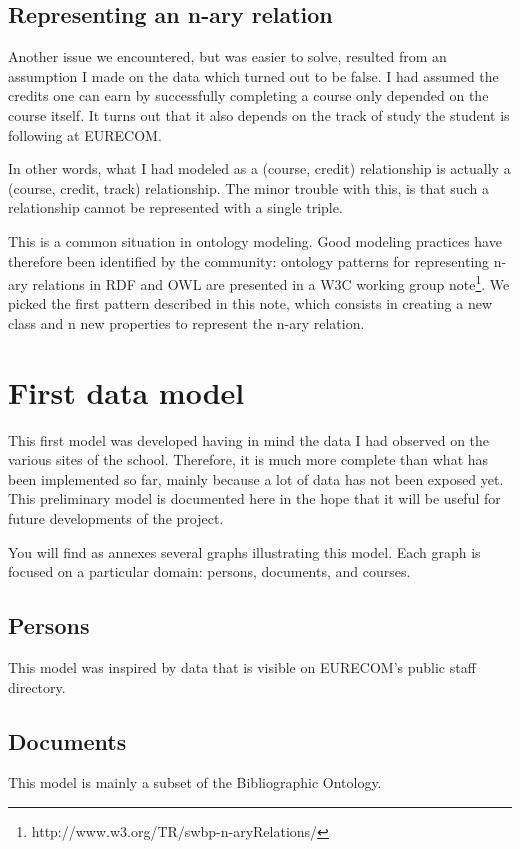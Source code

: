 \documentclass[a4paper,11pt]{report}
\begin{document}
\subsection{Representing an n-ary relation}
Another issue we encountered, but was easier to solve, resulted from an assumption I made on the data which turned out to be false. I had assumed the credits one can earn by successfully completing a course only depended on the course itself. It turns out that it also depends on the track of study the student is following at EURECOM. 

In other words, what I had modeled as a (course, credit) relationship is actually a (course, credit, track) relationship. The minor trouble with this, is that such a relationship cannot be represented with a single triple. 

This is a common situation in ontology modeling. Good modeling practices have therefore been identified by the community: ontology patterns for representing n-ary relations in RDF and OWL are presented in a W3C working group note\footnote{http://www.w3.org/TR/swbp-n-aryRelations/}. We picked the first pattern described in this note, which consists in creating a new class and n new properties to represent the n-ary relation. 

\section{First data model}
This first model was developed having in mind the data I had observed on the various sites of the school. Therefore, it is much more complete than what has been implemented so far, mainly because a lot of data has not been exposed yet. This preliminary model is documented here in the hope that it will be useful for future developments of the project. 

You will find as annexes several graphs illustrating this model. Each graph is focused on a particular domain: persons, documents, and courses. 

\subsection{Persons}
This model was inspired by data that is visible on EURECOM's public staff directory. 

\subsection{Documents}
This model is mainly a subset of the Bibliographic Ontology.
\end{document}

